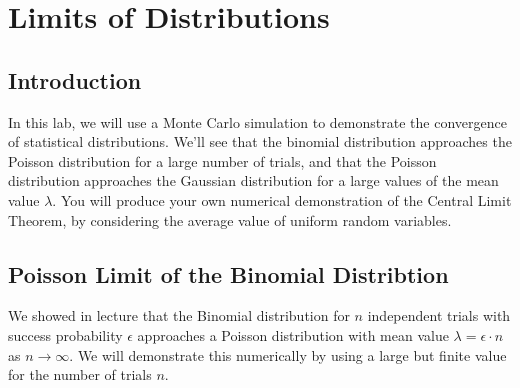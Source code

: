 \chapter{Limits of Distributions}

\section{Introduction}

In this lab, we will use a Monte Carlo simulation to demonstrate the
convergence of statistical distributions.  We'll see that the binomial
distribution approaches the Poisson distribution for a large number of
trials, and that the Poisson distribution approaches the Gaussian
distribution for a large values of the mean value $\lambda$.  You will
produce your own numerical demonstration of the Central Limit Theorem,
by considering the average value of uniform random variables.

\section{Poisson Limit of the Binomial Distribtion}

We showed in lecture that the Binomial distribution for $n$
independent trials with success probability $\epsilon$ approaches a
Poisson distribution with mean value $\lambda = \epsilon \cdot n$ as $n\to
\infty$.  We will demonstrate this numerically by using a large but
finite value for the number of trials $n$.

